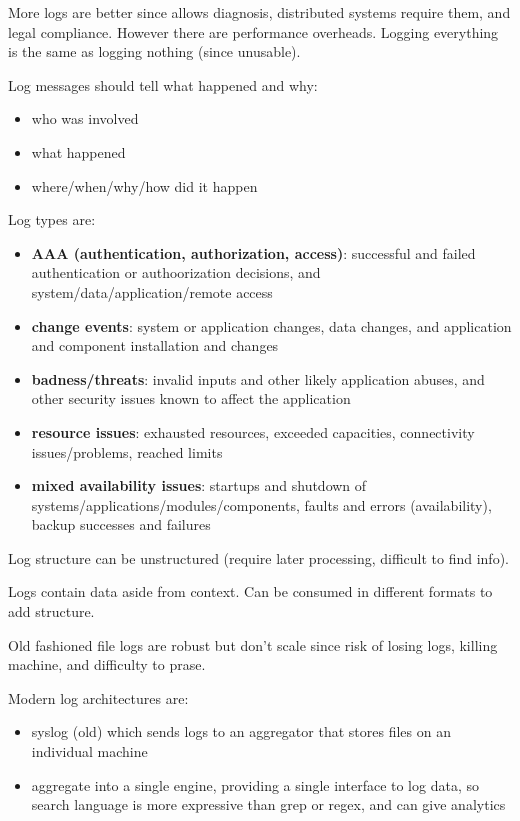 \documentclass[11pt]{article}
\begin{document}
More logs are better since allows diagnosis, distributed systems require them, and legal compliance.
However there are performance overheads.
Logging everything is the same as logging nothing (since unusable).

Log messages should tell what happened and why:
\begin{itemize}
\item who was involved
\item what happened
\item where/when/why/how did it happen
\end{itemize}

Log types are:
\begin{itemize}
\item \textbf{AAA (authentication, authorization, access)}: successful and failed authentication or authoorization
decisions, and system/data/application/remote access
\item \textbf{change events}: system or application changes, data changes, and application and component installation
and changes
\item \textbf{badness/threats}: invalid inputs and other likely application abuses, and other security issues known
to affect the application
\item \textbf{resource issues}: exhausted resources, exceeded capacities, connectivity issues/problems, reached limits
\item \textbf{mixed availability issues}: startups and shutdown of systems/applications/modules/components, faults
and errors (availability), backup successes and failures
\end{itemize}

Log structure can be unstructured (require later processing, difficult to find info).

Logs contain data aside from context.
Can be consumed in different formats to add structure.

Old fashioned file logs are robust but don't scale since risk of losing logs, killing machine, and
difficulty to prase.

Modern log architectures are:
\begin{itemize}
\item syslog (old) which sends logs to an aggregator that stores files on an individual machine
\item aggregate into a single engine, providing a single interface to log data, so search language is
more expressive than grep or regex, and can give analytics
\end{itemize}
\end{document}
